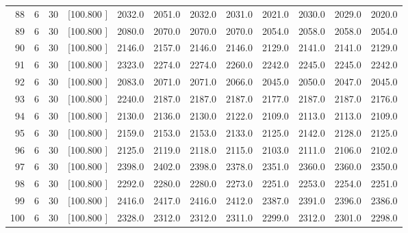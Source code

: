 \documentclass[12pt,a4paper]{article}
\begin{document}
\begin{center}
{\begin{tabular}{r r r r r r r r r r r r}
  88&  6& 30&[100.800   ]&  2032.0&  2051.0&  2032.0&  2031.0&  2021.0&  2030.0&  2029.0&  2020.0\\[-0.02in]
  89&  6& 30&[100.800   ]&  2080.0&  2070.0&  2070.0&  2070.0&  2054.0&  2058.0&  2058.0&  2054.0\\[-0.02in]
  90&  6& 30&[100.800   ]&  2146.0&  2157.0&  2146.0&  2146.0&  2129.0&  2141.0&  2141.0&  2129.0\\[-0.02in]
  91&  6& 30&[100.800   ]&  2323.0&  2274.0&  2274.0&  2260.0&  2242.0&  2245.0&  2245.0&  2242.0\\[-0.02in]
  92&  6& 30&[100.800   ]&  2083.0&  2071.0&  2071.0&  2066.0&  2045.0&  2050.0&  2047.0&  2045.0\\[-0.02in]
  93&  6& 30&[100.800   ]&  2240.0&  2187.0&  2187.0&  2187.0&  2177.0&  2187.0&  2187.0&  2176.0\\[-0.02in]
  94&  6& 30&[100.800   ]&  2130.0&  2136.0&  2130.0&  2122.0&  2109.0&  2113.0&  2113.0&  2109.0\\[-0.02in]
  95&  6& 30&[100.800   ]&  2159.0&  2153.0&  2153.0&  2133.0&  2125.0&  2142.0&  2128.0&  2125.0\\[-0.02in]
  96&  6& 30&[100.800   ]&  2125.0&  2119.0&  2118.0&  2115.0&  2103.0&  2111.0&  2106.0&  2102.0\\[-0.02in]
  97&  6& 30&[100.800   ]&  2398.0&  2402.0&  2398.0&  2378.0&  2351.0&  2360.0&  2360.0&  2350.0\\[-0.02in]
  98&  6& 30&[100.800   ]&  2292.0&  2280.0&  2280.0&  2273.0&  2251.0&  2253.0&  2254.0&  2251.0\\[-0.02in]
  99&  6& 30&[100.800   ]&  2416.0&  2417.0&  2416.0&  2412.0&  2387.0&  2391.0&  2396.0&  2386.0\\[-0.02in]
 100&  6& 30&[100.800   ]&  2328.0&  2312.0&  2312.0&  2311.0&  2299.0&  2312.0&  2301.0&  2298.0\\[-0.02in]

\hline
\end{tabular}}
\end{center}
\newpage
\end{document}
